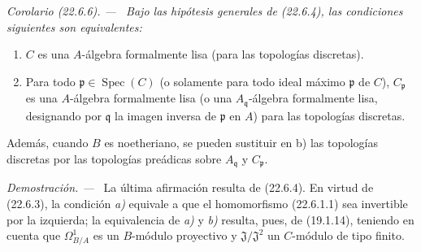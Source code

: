 \documentclass[10pt,oneside]{book}
\makeatletter
\newcommand{\setmanualcurrentlabel}[1]{\def\@currentlabel{#1}}
\newenvironment{corollary}[1][]{%
  \setmanualcurrentlabel{#1}\par\medskip\noindent\itshape Corolario (#1). ---\ }{\par}
\newenvironment{proof}{%
  \par\medskip\noindent\textit{Demostración. ---\ }}{\par}
\makeatother
\begin{document}
\begin{corollary}[22.6.6]
\label{0.22.6.6-es}
Bajo las hipótesis generales de \textup{(22.6.4)}, las condiciones siguientes son
equivalentes:
\begin{enumerate}
  \item[\textup{a)}] $C$ es una $A$-álgebra formalmente lisa (para las topologías
  discretas).
  \item[\textup{b)}] Para todo $\mathfrak p\in\operatorname{Spec}(C)$ \textup{(o solamente para todo ideal}
  máximo \textup{$\mathfrak p$ de $C$)}, $C_{\mathfrak p}$ es una $A$-álgebra
  formalmente lisa \textup{(o una $A_{\mathfrak q}$-álgebra formalmente lisa, designando
  por $\mathfrak q$ la imagen inversa de $\mathfrak p$ en $A$)}
  para las topologías discretas.
\end{enumerate}
Además, cuando $B$ es noetheriano, se pueden sustituir en \textup{b)} las topologías
discretas por las topologías preádicas sobre $A_{\mathfrak q}$ y
$C_{\mathfrak p}$.
\end{corollary}

\begin{proof}
La última afirmación resulta de (22.6.4). En virtud de (22.6.3), la condición
\emph{a)} equivale a que el homomorfismo (22.6.1.1) sea invertible por la izquierda;
la equivalencia de \emph{a)} y \emph{b)} resulta, pues, de (19.1.14), teniendo en cuenta que
$\Omega^1_{B/A}$ es un $B$-módulo proyectivo y $\mathfrak J/\mathfrak J^2$
un $C$-módulo de tipo finito.
\end{proof}
\end{document}
